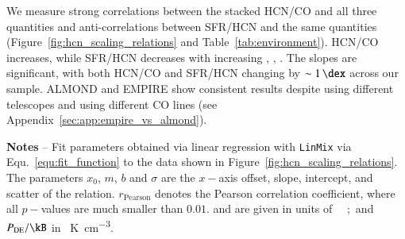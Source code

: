 \documentclass[letter, longauth]{aa} %
\begin{document}
We measure strong correlations between the stacked HCN/CO and all three quantities and anti-correlations between SFR/HCN and the same quantities (Figure~\ref{fig:hcn_scaling_relations} and Table~\ref{tab:environment}). 
HCN/CO increases, while SFR/HCN decreases with increasing \sigstar, \sigmol, \pde. 
The slopes are significant, with both HCN/CO and SFR/HCN changing by $\sim\SI{1}{\dex}$ across our sample. 
ALMOND and EMPIRE show consistent results despite using different telescopes and using different CO lines (see Appendix~\ref{sec:app:empire_vs_almond}).



\begin{table}
\begin{center}
\caption{Dense gas tracer and environment in ALMOND and EMPIRE}
\label{tab:environment}
\end{center}
{\bf Notes} --
Fit parameters obtained via linear regression with \texttt{LinMix}  via Equ.~\ref{equ:fit_function} to the data shown in Figure~\ref{fig:hcn_scaling_relations}. 
The parameters $x_0$, $m$, $b$ and $\sigma$ are the $x-$axis offset, slope, intercept, and scatter of the relation.
$r_\mathrm{Pearson}$ denotes the Pearson correlation coefficient, where all $p-$values are much smaller than $0.01$.
\sigstar and \sigmol are given in units of \SI{}{\msun\per\square\parsec}; and $\pde/\SI{}{\kB}$ in \SI{}{\kelvin\per\cubic\centi\metre}.\\
\end{table}
\end{document}

